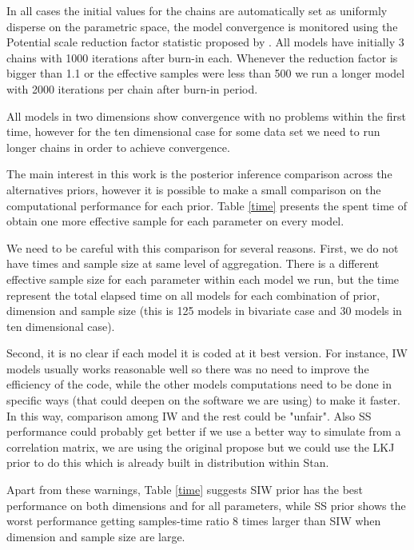 \documentclass{article}
\begin{document}
In all cases the initial values for the chains are automatically set as uniformly disperse on the parametric space, the model convergence is monitored using the Potential scale reduction factor statistic proposed by \cite{bda2003}. All models have initially 3 chains with 1000 iterations after burn-in each. Whenever the reduction factor is bigger than 1.1 or the effective samples were less than 500 we run a longer model with 2000 iterations per chain after burn-in period. 



All models in two dimensions show convergence with no problems within the first time, however for the ten dimensional case for some data set we need to run longer chains in order to achieve convergence. 

The main interest in this work is the posterior inference comparison across the alternatives priors, however it is possible to make a small comparison on the computational performance for each prior. Table \ref{time} presents the spent time of obtain one more effective sample for each parameter on every model. 

We need to be careful with this comparison for several reasons. First, we do not have times and sample size at same level of aggregation.  There is a different effective sample size for each parameter within each model we run, but the time represent the total elapsed time on all models for each combination of prior, dimension and sample size (this is 125 models in bivariate case and 30 models in ten dimensional case).

Second, it is no clear if each model it is coded at it best version.  For instance, IW models usually works reasonable well so there was no need to improve the efficiency of the code, while the other models computations need to be done in specific ways (that could deepen on the software we are using) to make it faster. In this way, comparison among IW and the rest could be "unfair".  Also SS performance could  probably get better if we use a better way to simulate from a correlation matrix, we are using the \cite{barnard2000} original propose but we could use the LKJ prior to do this which is already built in distribution within Stan. 

Apart from these warnings, Table \ref{time} suggests  SIW prior has the best performance on both dimensions and for all parameters, while SS prior shows  the worst performance getting samples-time ratio 8 times larger than SIW when dimension and sample size are large. 
\end{document}
